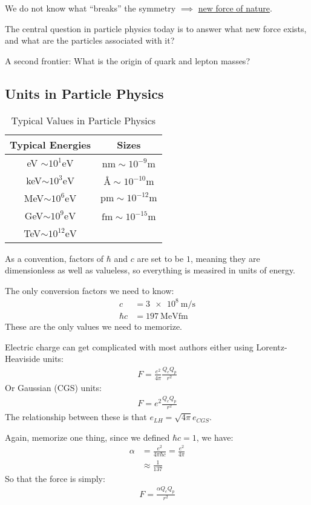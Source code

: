 We do not know what ``breaks'' the symmetry $\implies$ \underline{new force of nature}.

The central question in particle physics today is to answer what new force exists, and what are the particles associated with it?

A second frontier: What is the origin of quark and lepton masses?

\subsection{Units in Particle Physics}
\begin{table}[H]
  \centering
  \begin{tabular}{c|c}
    Typical Energies & Sizes\\ \hline
    \si{\eV} $\sim10^{1} \si{\eV}$ & $\si{\nm}\sim10^{-9}\si{\m}$  \\
    \si{\keV}$\sim10^{3} \si{\eV}$ & $\si{\angstrom}\sim10^{-10}\si{\m}$  \\
    \si{\MeV}$\sim10^{6} \si{\eV}$ & $\si{\pm}\sim10^{-12}\si{\m}$  \\
    \si{\GeV}$\sim10^{9} \si{\eV}$ & $\si{\femto\m}\sim10^{-15}\si{\m}$  \\
    \si{\TeV}$\sim10^{12}\si{\eV}$
  \end{tabular}
  \caption{Typical Values in Particle Physics}
\end{table}

\begin{definition}
  As a convention, factors of $\hbar$ and $c$ are set to be $1$, meaning they are dimensionless as well as valueless, so everything is measired in units of energy.

  The only conversion factors we need to know:
  \begin{align*}
    c&=\SI{3e8}{\m\per\s}\\
    \hbar c&=\SI{197}{\MeV\femto\m}
  \end{align*}
  These are the only values we need to memorize.
\end{definition}

Electric charge can get complicated with most authors either using Lorentz-Heaviside units:
\begin{align*}
  F=\frac{e^2}{4\pi}\frac{Q_e Q_p}{r^2}
\end{align*}
Or Gaussian (CGS) units:
\begin{align*}
  F=e^2\frac{Q_e Q_p}{r^2}
\end{align*}
The relationship between these is that $e_{LH}=\sqrt{4\pi}e_{CGS}$.

Again, memorize one thing, since we defined $\hbar c=1$, we have:
\begin{align*}
  \alpha&=\frac{e^2}{4\pi\hbar c}=\frac{e^2}{4\pi}\\
  &\approx\frac1{137}
\end{align*}
So that the force is simply:
\begin{align*}
  F=\frac{\alpha Q_e Q_p}{r^2}
\end{align*}
